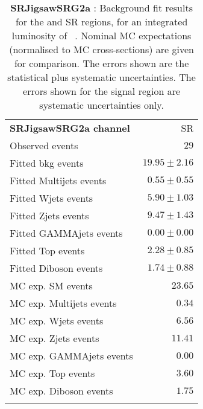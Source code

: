 

\begin{table}
\begin{center}
\setlength{\tabcolsep}{0.0pc}
{\tiny
\begin{tabular*}{\textwidth}{@{\extracolsep{\fill}}lr}
\noalign{\smallskip}\hline\noalign{\smallskip}
{\bf SRJigsawSRG2a channel}           & SR              \\[-0.05cm]
\noalign{\smallskip}\hline\noalign{\smallskip}
Observed events          & $29$                    \\
\noalign{\smallskip}\hline\noalign{\smallskip}
Fitted bkg events         & $19.95 \pm 2.16$              \\
\noalign{\smallskip}\hline\noalign{\smallskip}
        Fitted Multijets events         & $0.55 \pm 0.55$              \\
        Fitted Wjets events         & $5.90 \pm 1.03$              \\
        Fitted Zjets events         & $9.47 \pm 1.43$              \\
        Fitted GAMMAjets events         & $0.00 \pm 0.00$              \\
        Fitted Top events         & $2.28 \pm 0.85$              \\
        Fitted Diboson events         & $1.74 \pm 0.88$              \\
 \noalign{\smallskip}\hline\noalign{\smallskip}
MC exp. SM events              & $23.65$              \\
\noalign{\smallskip}\hline\noalign{\smallskip}
        MC exp. Multijets events         & $0.34$              \\
        MC exp. Wjets events         & $6.56$              \\
        MC exp. Zjets events         & $11.41$              \\
        MC exp. GAMMAjets events         & $0.00$              \\
        MC exp. Top events         & $3.60$              \\
        MC exp. Diboson events         & $1.75$              \\
\noalign{\smallskip}\hline\noalign{\smallskip}
\end{tabular*}
}
\end{center}
\caption{{\bf SRJigsawSRG2a} : Background fit results for the  and SR regions, for an integrated luminosity of \ourintlumi~\ifb. Nominal MC expectations (normalised to MC cross-sections) are given for comparison. The errors shown are the statistical plus systematic uncertainties. The errors shown for the signal region are systematic uncertainties only.}
\label{table.results.systematics.in.logL.fit.SR.SRJigsawSRG2a}
\end{table}
%